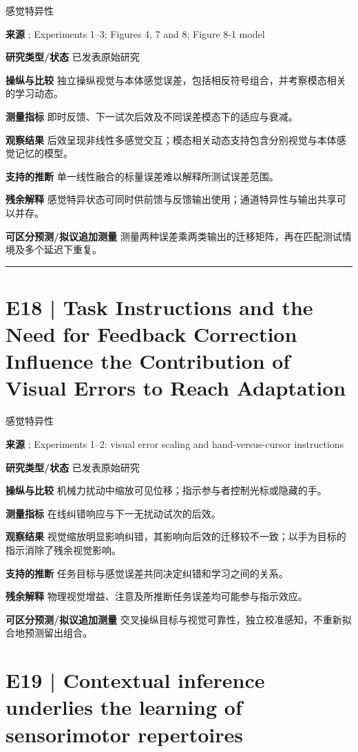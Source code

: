 \documentclass[11pt,a4paper]{article}
\begin{document}
{\small\sffamily\color{navy} 感觉特异性}\par
\textbf{来源} \cite{hayashi2020}; Experiments 1--3; Figures 4, 7 and 8; Figure 8-1 model\par
\textbf{研究类型/状态} 已发表原始研究\par
\textbf{操纵与比较} 独立操纵视觉与本体感觉误差，包括相反符号组合，并考察模态相关的学习动态。\par
\textbf{测量指标} 即时反馈、下一试次后效及不同误差模态下的适应与衰减。\par
\textbf{观察结果} 后效呈现非线性多感觉交互；模态相关动态支持包含分别视觉与本体感觉记忆的模型。\par
\textbf{支持的推断} 单一线性融合的标量误差难以解释所测试误差范围。\par
\textbf{残余解释} 感觉特异状态可同时供前馈与反馈输出使用；通道特异性与输出共享可以并存。\par
\textbf{可区分预测/拟议追加测量} 测量两种误差乘两类输出的迁移矩阵，再在匹配测试情境及多个延迟下重复。\par
\bigskip\hrule\medskip\section{E18 | Task Instructions and the Need for Feedback Correction Influence the Contribution of Visual Errors to Reach Adaptation}
{\small\sffamily\color{navy} 感觉特异性}\par
\textbf{来源} \cite{hoffmann2023}; Experiments 1--2: visual error scaling and hand-versus-cursor instructions\par
\textbf{研究类型/状态} 已发表原始研究\par
\textbf{操纵与比较} 机械力扰动中缩放可见位移；指示参与者控制光标或隐藏的手。\par
\textbf{测量指标} 在线纠错响应与下一无扰动试次的后效。\par
\textbf{观察结果} 视觉缩放明显影响纠错，其影响向后效的迁移较不一致；以手为目标的指示消除了残余视觉影响。\par
\textbf{支持的推断} 任务目标与感觉误差共同决定纠错和学习之间的关系。\par
\textbf{残余解释} 物理视觉增益、注意及所推断任务误差均可能参与指示效应。\par
\textbf{可区分预测/拟议追加测量} 交叉操纵目标与视觉可靠性，独立校准感知，不重新拟合地预测留出组合。\par
\clearpage\section{E19 | Contextual inference underlies the learning of sensorimotor repertoires}
\end{document}
